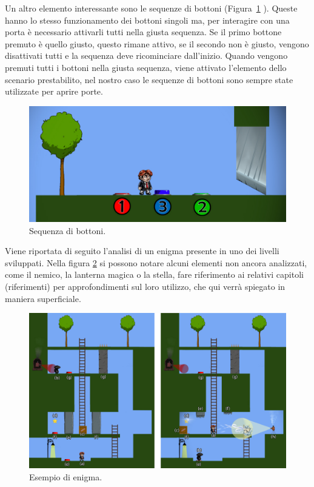 Un altro elemento interessante sono le sequenze di bottoni (Figura~\ref{fig:platform_sequenza_bottoni}
). Queste hanno lo stesso funzionamento dei bottoni singoli ma, per interagire con una porta è necessario attivarli tutti nella giusta sequenza. Se il primo bottone premuto è quello giusto, questo rimane attivo, se il secondo non è giusto, vengono disattivati tutti e la sequenza deve ricominciare dall’inizio. Quando vengono premuti tutti i bottoni nella giusta sequenza, viene attivato l’elemento dello scenario prestabilito, nel nostro caso le sequenze di bottoni sono sempre state utilizzate per aprire porte.

\begin{figure}%
	\centering
	\includegraphics[width= 0.7\columnwidth]{images/gameDesign/12.jpg}
	\caption{Sequenza di bottoni.}
	\label{fig:platform_sequenza_bottoni}
\end{figure}

Viene riportata di seguito l’analisi di un enigma presente in uno dei livelli sviluppati. Nella figura \ref{fig:platform_enigma} si possono notare alcuni elementi non ancora analizzati, come il nemico, la lanterna magica o la stella, fare riferimento ai relativi capitoli (riferimenti) per approfondimenti sul loro utilizzo, che qui verrà spiegato in maniera superficiale.

\begin{figure}%
	\centering
	\includegraphics[width= \columnwidth]{images/gameDesign/13.jpg}
	\caption{Esempio di enigma.}
	\label{fig:platform_enigma}
\end{figure}

